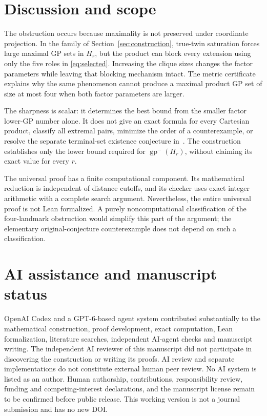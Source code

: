 \documentclass[11pt]{article}
\theoremstyle{definition}
\theoremstyle{remark}
\newcommand{\lgp}{\operatorname{gp}^{-}}
\begin{document}
\section{Discussion and scope}\label{sec:discussion}

The obstruction occurs because maximality is not preserved under
coordinate projection. In the family of Section~\ref{sec:construction},
true-twin saturation forces large maximal GP sets in $H_r$, but the product
can block every extension using only the five roles in \eqref{eq:selected}.
Increasing the clique sizes changes the factor parameters while leaving
that blocking mechanism intact. The metric certificate explains why the
same phenomenon cannot produce a maximal product GP set of size at most
four when both factor parameters are larger.

The sharpness is scalar: it determines the best bound from the smaller
factor lower-GP number alone. It does not give an exact formula for every
Cartesian product, classify all extremal pairs, minimize the order of a
counterexample, or resolve the separate terminal-set existence conjecture
in~\cite{WKT}. The construction establishes only the lower bound required
for $\lgp(H_r)$, without claiming its exact value for every $r$.

The universal proof has a finite computational component. Its mathematical
reduction is independent of distance cutoffs, and its checker uses exact
integer arithmetic with a complete search argument. Nevertheless, the
entire universal proof is not Lean formalized. A purely noncomputational
classification of the four-landmark obstruction would simplify this part
of the argument; the elementary original-conjecture counterexample does
not depend on such a classification.

\section*{AI assistance and manuscript status}

OpenAI Codex and a GPT-6-based agent system contributed substantially to
the mathematical construction, proof development, exact computation,
Lean formalization, literature searches, independent AI-agent checks and
manuscript writing. The independent AI reviewer of this manuscript did not
participate in discovering the construction or writing its proofs.
AI review and separate implementations do not constitute external human
peer review. No AI system is listed as an author. Human authorship,
contributions, responsibility review, funding and competing-interest
declarations, and the manuscript license remain to be confirmed before
public release. This working version is not a journal submission and has
no new DOI.
\end{document}
